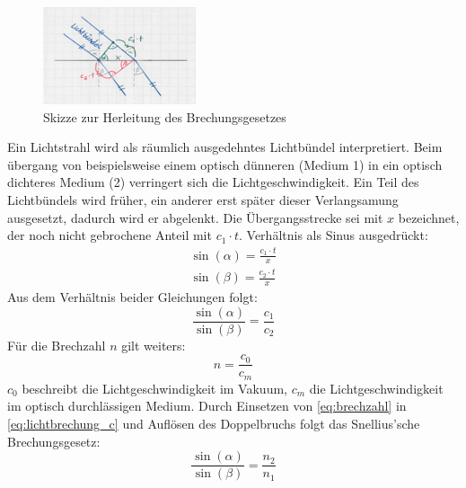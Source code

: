 \documentclass[a4paper, 11pt, ngerman, parskip=half]{scrartcl}
\begin{document}
\begin{figure}[H]
    \centering
    \begin{samepage}
        \includegraphics[width=0.4\textwidth]{image/15/brechungsgesetz.jpg}
        \caption{Skizze zur Herleitung des Brechungsgesetzes}
        \label{fig:brechungsgesetz}
    \end{samepage}
\end{figure}
%
Ein Lichtstrahl wird als räumlich ausgedehntes Lichtbündel interpretiert. Beim übergang von beispielsweise einem optisch dünneren (Medium 1) in ein optisch dichteres Medium (2) verringert sich die Lichtgeschwindigkeit. Ein Teil des Lichtbündels wird früher, ein anderer erst später dieser Verlangsamung ausgesetzt, dadurch wird er abgelenkt. Die Übergangsstrecke sei mit $x$ bezeichnet, der noch nicht gebrochene Anteil mit $c_1 \cdot t$. Verhältnis als Sinus ausgedrückt:
%
\begin{equation}
    \begin{split}
        \sin(\alpha) = \frac{c_1 \cdot t}{x} \\
        \sin(\beta) = \frac{c_2 \cdot t}{x}
    \end{split}
\end{equation}
%
Aus dem Verhältnis beider Gleichungen folgt:
\begin{equation}
    \label{eq:lichtbrechung_c}
    \frac{\sin(\alpha)}{\sin(\beta)} = \frac{c_1}{c_2}
\end{equation}
%
Für die Brechzahl $n$ gilt weiters:
\begin{equation}
    \label{eq:brechzahl}
    n = \frac{c_0}{c_m}
\end{equation}
%
$c_0$ beschreibt die Lichtgeschwindigkeit im Vakuum, $c_m$ die Lichtgeschwindigkeit im optisch durchlässigen Medium. Durch Einsetzen von \autoref{eq:brechzahl} in \autoref{eq:lichtbrechung_c} und Auflösen des Doppelbruchs folgt das Snellius'sche Brechungsgesetz:
%
\begin{equation}
    \label{eq:brechungsgesetz_n}
    \frac{\sin(\alpha)}{\sin(\beta)} = \frac{n_2}{n_1}
\end{equation}
\end{document}
